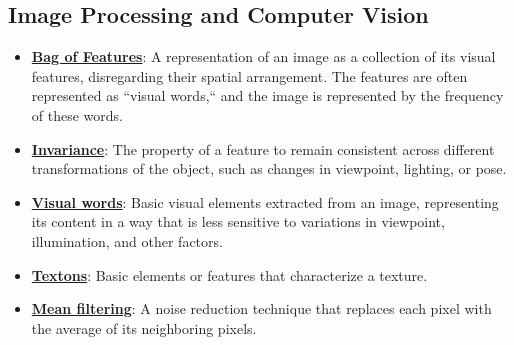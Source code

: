 \documentclass{article}%
\begin{document}
\subsection{Image Processing and Computer Vision}%
\label{subsec:ImageProcessingandComputerVision}%
\begin{itemize}[leftmargin=*]%
\item \href{https://purdue.brightspace.com/d2l/common/assets/pdfjs-d2l-dist/1.0.14-legacy/web/viewer.html?file=\%2Fcontent\%2Fenforced\%2F1095467-wl.202510.CS.24300.001\%2F07L2-Vision.pdf\%3Fou\%3D1095467\&lang=en-us\&container=d2l-fileviewer-rendered-pdf\&fullscreen=d2l-fileviewer-rendered-pdf-dialog\&height=667#page=12}{\textbf{Bag of Features}}: A representation of an image as a collection of its visual features, disregarding their spatial arrangement. The features are often represented as ``visual words,`` and the image is represented by the frequency of these words.%
\item \href{https://purdue.brightspace.com/d2l/common/assets/pdfjs-d2l-dist/1.0.14-legacy/web/viewer.html?file=\%2Fcontent\%2Fenforced\%2F1095467-wl.202510.CS.24300.001\%2F07L2-Vision.pdf\%3Fou\%3D1095467\&lang=en-us\&container=d2l-fileviewer-rendered-pdf\&fullscreen=d2l-fileviewer-rendered-pdf-dialog\&height=667#page=21}{\textbf{Invariance}}: The property of a feature to remain consistent across different transformations of the object, such as changes in viewpoint, lighting, or pose.%
\item \href{https://purdue.brightspace.com/d2l/common/assets/pdfjs-d2l-dist/1.0.14-legacy/web/viewer.html?file=\%2Fcontent\%2Fenforced\%2F1095467-wl.202510.CS.24300.001\%2F07L2-Vision.pdf\%3Fou\%3D1095467\&lang=en-us\&container=d2l-fileviewer-rendered-pdf\&fullscreen=d2l-fileviewer-rendered-pdf-dialog\&height=667#page=14}{\textbf{Visual words}}: Basic visual elements extracted from an image, representing its content in a way that is less sensitive to variations in viewpoint, illumination, and other factors.%
\item \href{https://purdue.brightspace.com/d2l/common/assets/pdfjs-d2l-dist/1.0.14-legacy/web/viewer.html?file=\%2Fcontent\%2Fenforced\%2F1095467-wl.202510.CS.24300.001\%2F07L2-Vision.pdf\%3Fou\%3D1095467\&lang=en-us\&container=d2l-fileviewer-rendered-pdf\&fullscreen=d2l-fileviewer-rendered-pdf-dialog\&height=667#page=28}{\textbf{Textons}}: Basic elements or features that characterize a texture.%
\item \href{https://purdue.brightspace.com/d2l/common/assets/pdfjs-d2l-dist/1.0.14-legacy/web/viewer.html?file=\%2Fcontent\%2Fenforced\%2F1095467-wl.202510.CS.24300.001\%2F07L2-Vision.pdf\%3Fou\%3D1095467\&lang=en-us\&container=d2l-fileviewer-rendered-pdf\&fullscreen=d2l-fileviewer-rendered-pdf-dialog\&height=667#page=38}{\textbf{Mean filtering}}: A noise reduction technique that replaces each pixel with the average of its neighboring pixels.%

\end{itemize}
\end{document}
